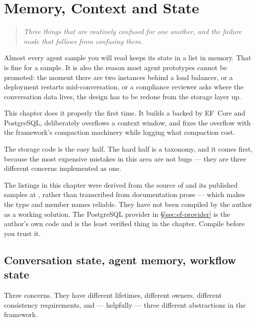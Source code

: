 \chapter{Memory, Context and State}
\label{ch:memory}

\begin{quote}\itshape
Three things that are routinely confused for one another, and the failure mode
that follows from confusing them.
\end{quote}

\noindent
Almost every agent sample you will read keeps its state in a list in memory. That
is fine for a sample. It is also the reason most agent prototypes cannot be
promoted: the moment there are two instances behind a load balancer, or a
deployment restarts mid-conversation, or a compliance reviewer asks where the
conversation data lives, the design has to be redone from the storage layer up.

This chapter does it properly the first time. It builds a
 backed by EF~Core and PostgreSQL, deliberately overflows
a context window, and fixes the overflow with the framework's compaction
machinery while logging what compaction cost.

The storage code is the easy half. The hard half is a taxonomy, and it comes
first, because the most expensive mistakes in this area are not bugs --- they are
three different concerns implemented as one.

\begin{verifybox}
The listings in this chapter were derived from the source of
 and its published samples at \mafcore{}, rather than
transcribed from documentation prose --- which makes the type and member names
reliable. They have not been compiled by the author as a working solution. The
PostgreSQL provider in \S\ref{sec:ef-provider} is the author's own code and is
the least verified thing in the chapter. Compile before you trust it.
\end{verifybox}

\section{Conversation state, agent memory, workflow state}
\label{sec:taxonomy}

Three concerns. They have different lifetimes, different owners, different
consistency requirements, and --- helpfully --- three different abstractions in
the framework.

